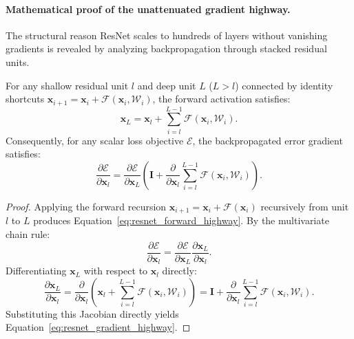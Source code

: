 \paragraph{Mathematical proof of the unattenuated gradient highway.}
The structural reason ResNet scales to hundreds of layers without vanishing gradients is revealed by analyzing backpropagation through stacked residual units.

\begin{theorem}
\label{thm:resnet_gradient_flow}
For any shallow residual unit $l$ and deep unit $L$ ($L > l$) connected by identity shortcuts $\mathbf{x}_{i+1} = \mathbf{x}_i + \mathcal{F}(\mathbf{x}_i, \mathcal{W}_i)$, the forward activation satisfies:
\begin{equation}
\mathbf{x}_L = \mathbf{x}_l + \sum_{i=l}^{L-1} \mathcal{F}(\mathbf{x}_i, \mathcal{W}_i).
\label{eq:resnet_forward_highway}
\end{equation}
Consequently, for any scalar loss objective $\mathcal{E}$, the backpropagated error gradient satisfies:
\begin{equation}
\frac{\partial \mathcal{E}}{\partial \mathbf{x}_l} = \frac{\partial \mathcal{E}}{\partial \mathbf{x}_L} \left( \mathbf{I} + \frac{\partial}{\partial \mathbf{x}_l} \sum_{i=l}^{L-1} \mathcal{F}(\mathbf{x}_i, \mathcal{W}_i) \right).
\label{eq:resnet_gradient_highway}
\end{equation}
\end{theorem}

\begin{proof}
Applying the forward recursion $\mathbf{x}_{i+1} = \mathbf{x}_i + \mathcal{F}(\mathbf{x}_i)$ recursively from unit $l$ to $L$ produces Equation~\eqref{eq:resnet_forward_highway}. By the multivariate chain rule:
\begin{equation}
\frac{\partial \mathcal{E}}{\partial \mathbf{x}_l} = \frac{\partial \mathcal{E}}{\partial \mathbf{x}_L} \frac{\partial \mathbf{x}_L}{\partial \mathbf{x}_l}.
\end{equation}
Differentiating $\mathbf{x}_L$ with respect to $\mathbf{x}_l$ directly:
\begin{equation}
\frac{\partial \mathbf{x}_L}{\partial \mathbf{x}_l} = \frac{\partial}{\partial \mathbf{x}_l} \left( \mathbf{x}_l + \sum_{i=l}^{L-1} \mathcal{F}(\mathbf{x}_i, \mathcal{W}_i) \right) = \mathbf{I} + \frac{\partial}{\partial \mathbf{x}_l} \sum_{i=l}^{L-1} \mathcal{F}(\mathbf{x}_i, \mathcal{W}_i).
\end{equation}
Substituting this Jacobian directly yields Equation~\eqref{eq:resnet_gradient_highway}.
\end{proof}

